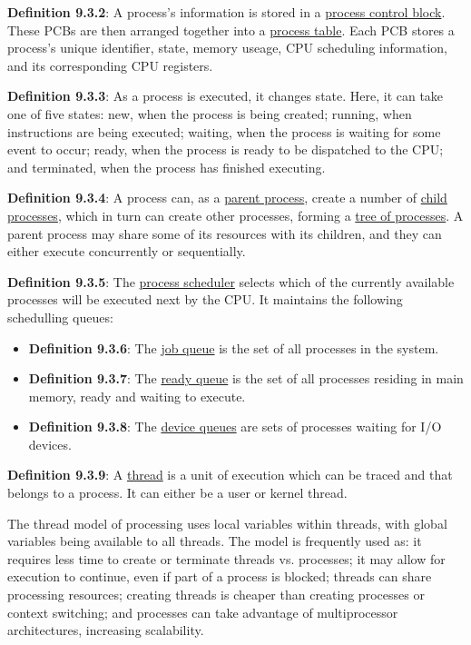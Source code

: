 \documentclass{article}
\newcommand{\separate}[1] {\vspace{#1 pt}\noindent}
\newcommand{\definition}[2]{\textbf{Definition #1}: #2\label{def:#1}}
\begin{document}
\separate{7}\definition{9.3.2}{A process's information is stored in a \underline{process control block}. These PCBs are then arranged together into a \underline{process table}. Each PCB stores a process's unique identifier, state, memory useage, CPU scheduling information, and its corresponding CPU registers.}

\separate{7}\definition{9.3.3}{As a process is executed, it changes state. Here, it can take one of five states: new, when the process is being created; running, when instructions are being executed; waiting, when the process is waiting for some event to occur; ready, when the process is ready to be dispatched to the CPU; and terminated, when the process has finished executing.}

\separate{7}\definition{9.3.4}{A process can, as a \underline{parent process}, create a number of \underline{child processes}, which in turn can create other processes, forming a \underline{tree of processes}. A parent process may share some of its resources with its children, and they can either execute concurrently or sequentially.}

\separate{7}\definition{9.3.5}{The \underline{process scheduler} selects which of the currently available processes will be executed next by the CPU. It maintains the following schedulling queues:}
\begin{itemize}
    \item \definition{9.3.6}{The \underline{job queue} is the set of all processes in the system.}
    \item \definition{9.3.7}{The \underline{ready queue} is the set of all processes residing in main memory, ready and waiting to execute.}
    \item \definition{9.3.8}{The \underline{device queues} are sets of processes waiting for I/O devices.}
\end{itemize}

\separate{7}\definition{9.3.9}{A \underline{thread} is a unit of execution which can be traced and that belongs to a process. It can either be a user or kernel thread.}

\separate{7}The thread model of processing uses local variables within threads, with global variables being available to all threads. The model is frequently used as: it requires less time to create or terminate threads vs. processes; it may allow for execution to continue, even if part of a process is blocked; threads can share processing resources; creating threads is cheaper than creating processes or context switching; and processes can take advantage of multiprocessor architectures, increasing scalability.
\end{document}
